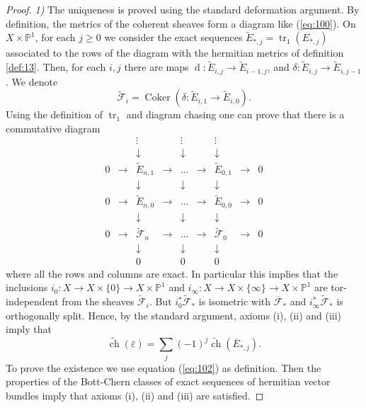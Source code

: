\documentclass[10pt,twoside]{article}
\numberwithin{equation}{section}
\theoremstyle{plain}
\theoremstyle{definition}
\DeclareMathOperator{\tr}{tr}
\DeclareMathOperator{\dd}{d}
\DeclareMathOperator{\ch}{ch}
\DeclareMathOperator{\Coker}{Coker}
\begin{document}
\begin{proof}
  \emph{1)} The uniqueness is proved using the standard
  deformation argument. By definition, the metrics of the coherent
  sheaves form a diagram like (\ref{eq:100}). On $X\times
  \mathbb{P}^{1}$, for each $j\ge 0$ we consider the exact sequences
  $\widetilde E_{\ast,j}=\tr_{1}(E_{\ast,j})$ associated to the rows
  of the diagram with the hermitian metrics
  of definition \ref{def:13}. Then, for each $i,j$ there are maps
  $\dd\colon\widetilde E_{i,j}\to \widetilde E_{i-1,j}$, and $\delta
  \colon\widetilde E_{i,j}\to \widetilde E_{i,j-1}$. We denote 
  $$\widetilde {\mathcal{F}}_{i}=
  \Coker(\delta \colon\widetilde E_{i,1}\to \widetilde E_{i,0}).$$
  Using the definition of $\tr_{1}$ and diagram chasing one can prove
  that there is a commutative diagram  
  \begin{equation} \label{eq:101}
    \begin{array}{ccccccccc}
      && \vdots && \vdots && \vdots && \\
      && \downarrow && \downarrow && \downarrow && \\
      0 & \rightarrow & \widetilde{E}_{n,1} & \rightarrow &
      \ldots & \rightarrow &
      \widetilde{E}_{0,1} & \rightarrow & 0\\
      && \downarrow && \downarrow && \downarrow && \\
      0 & \rightarrow & \widetilde{E}_{n,0} & \rightarrow &
      \ldots & \rightarrow &
      \widetilde{E}_{0,0} & \rightarrow & 0 \\
      && \downarrow && \downarrow && \downarrow && \\
      0 & \rightarrow & \widetilde{\mathcal{F}}_{n} & \rightarrow &
      \ldots & \rightarrow &
      \widetilde{\mathcal{F}}_{0} & \rightarrow & 0 \\
      && \downarrow && \downarrow && \downarrow && \\
      && 0 && 0 && 0 &&
    \end{array}  
  \end{equation}
  where all the rows and columns are exact. In particular this implies
  that the inclusions $i_{0}\colon X\to X\times \{0\}\to X\times
  \mathbb{P}^{1}$ and $i_{\infty}\colon X\to X\times \{\infty\}\to X\times
  \mathbb{P}^{1}$ are tor-independent from the sheaves $\widetilde
  {\mathcal{F}}_{i}$. But $i_{0}^{\ast}\widetilde
  {\mathcal{F}}_{\ast}$ is isometric with $\overline
  {\mathcal{F}}_{\ast}$ and $i_{\infty}^{\ast}\widetilde
  {\mathcal{F}}_{\ast}$ is orthogonally split. Hence, by the standard
  argument, axioms (i), (ii) and (iii) imply that
  \begin{equation}
    \label{eq:102}
    \widetilde{\ch}(\overline{\varepsilon})=
    \sum_{j}(-1)^{j}\widetilde{\ch}(\overline E_{\ast,j}).
  \end{equation}
  To prove the existence we use equation (\ref{eq:102}) as
  definition. Then the properties of the Bott-Chern classes of exact
  sequences of hermitian vector bundles imply that axioms (i), (ii)
  and (iii) are satisfied.


\end{proof}
\end{document}
